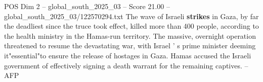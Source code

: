 \begin{textsample}{POS Dim 2 – global\_south\_2025\_03 – Score 21.00 – global\_south\_2025\_03/122570294.txt}
The wave of Israeli \textbf{strikes} in Gaza, by far the deadliest since the truce took effect, killed more than 400 people, according to the health ministry in the Hamas-run territory.
The massive, overnight operation threatened to resume the devastating war, with Israel ' s prime minister deeming it"essential"to ensure the release of hostages in Gaza.
Hamas accused the Israeli government of effectively signing a death warrant for the remaining captives. -- AFP

\end{textsample}
